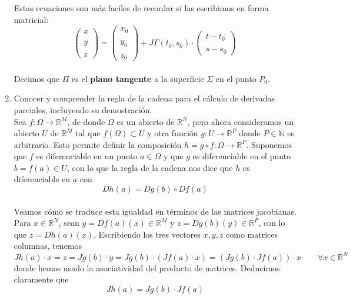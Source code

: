 \documentclass[a4paper, 12pt]{article}
\begin{document}
\begin{enumerate}[label=\textbf{\arabic*}.]
Estas ecuaciones son más faciles de recordar si las escribimos en forma matricial:
\begin{equation}\label{parametricas_ecuacion}
\begin{pmatrix}
x \\
\\
y \\
\\
z
\end{pmatrix} = 
\begin{pmatrix}
x_0 \\
\\
y_0 \\
\\
z_0
\end{pmatrix} + J \Gamma (t_0,s_0) \cdot
\begin{pmatrix}
t - t_0 \\
\\
s - s_0
\end{pmatrix}
\end{equation} \\

Decimos que \(\Pi\) es el \textbf{plano tangente} a la superficie \(\Sigma\) en el punto \(P_0\).

\bigskip

\item Conocer y comprender la regla de la cadena para el cálculo de derivadas parciales, incluyendo su demostración. \\

Sea \(f: \Omega \to \mathbb{R}^M\), de donde \(\Omega\) es un abierto de \(\mathbb{R}^N\), pero ahora consideramos un abierto \(U\) de \(\mathbb{R}^M\) tal que \(f(\Omega) \subset U\) y otra función \(g: U \to \mathbb{R}^P\) donde \(P \in \mathbb{N}\) es arbitrario. Esto permite definir la composición \(h = g \circ f: \Omega \to \mathbb{R}^P\). Suponemos que \(f\) es diferenciable en un punto \(a \in \Omega\) y que \(g\) es diferenciable en el punto \(b = f(a) \in U\), con lo que la regla de la cadena nos dice que \(h\) es diferenciable en \(a\) con
\[
	Dh(a) = Dg(b) \circ Df(a)
\] \\

Veamos cómo se traduce esta igualdad en términos de las matrices jacobianas. Para \(x \in \mathbb{R}^N\), sean \(y = Df(a)(x) \in \mathbb{R}^M\) y \(z = Dg(b)(y) \in \mathbb{R}^P\), con lo que \(z = Dh(a)(x)\). Escribiendo los tres vectores \(x,y,z\) como matrices columnas, tenemos
\[
	Jh(a) \cdot x = z = Jg(b) \cdot y = Jg(b) \cdot (Jf(a) \cdot x) = (Jg(b) \cdot Jf(a)) \cdot x \qquad \forall x \in \mathbb{R}^N
\]
donde hemos usado la asociatividad del producto de matrices. Deducimos claramente que 
\begin{equation}\label{cadena_1}
	Jh(a) = Jg(b) \cdot Jf(a)
\end{equation} \\


\end{enumerate}
\end{document}

